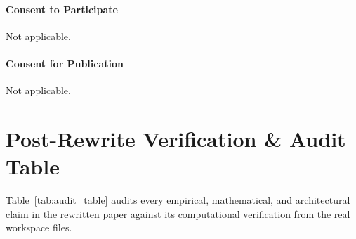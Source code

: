 \documentclass[11pt]{article}
\begin{document}
\paragraph{Consent to Participate}
Not applicable.

\paragraph{Consent for Publication}
Not applicable.




\newpage
\appendix
\section{Post-Rewrite Verification \& Audit Table}

Table~\ref{tab:audit_table} audits every empirical, mathematical, and architectural claim in the rewritten paper against its computational verification from the real workspace files.
\end{document}
